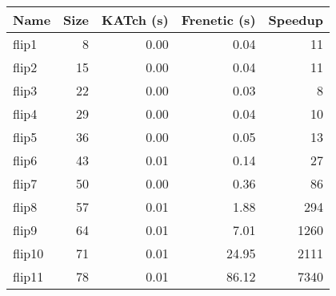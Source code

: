 \begin{tabular}{lrrrr}
\toprule
Name & Size & KATch (s) & Frenetic (s) & Speedup \\
\midrule
flip1 & 8 & 0.00 & 0.04 & 11 \\
flip2 & 15 & 0.00 & 0.04 & 11 \\
flip3 & 22 & 0.00 & 0.03 & 8 \\
flip4 & 29 & 0.00 & 0.04 & 10 \\
flip5 & 36 & 0.00 & 0.05 & 13 \\
flip6 & 43 & 0.01 & 0.14 & 27 \\
flip7 & 50 & 0.00 & 0.36 & 86 \\
flip8 & 57 & 0.01 & 1.88 & 294 \\
flip9 & 64 & 0.01 & 7.01 & 1260 \\
flip10 & 71 & 0.01 & 24.95 & 2111 \\
flip11 & 78 & 0.01 & 86.12 & 7340 \\
\bottomrule
\end{tabular}
